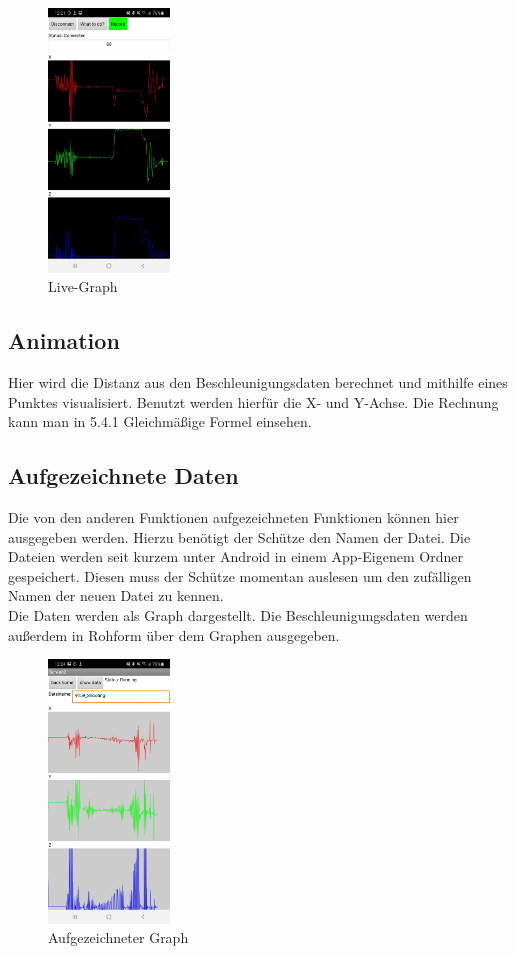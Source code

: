 \begin{figure} [h]
    \centering
    \includegraphics[height = 7cm]{Bilder/Graph}
    \caption{Live-Graph}
    \end{figure}

\subsection{Animation}
Hier wird die Distanz aus den Beschleunigungsdaten berechnet und mithilfe eines Punktes
visualisiert. Benutzt werden hierfür die X- und Y-Achse. Die Rechnung kann man in 
\refname { 5.4.1 Gleichmäßige Formel} einsehen.
\subsection{Aufgezeichnete Daten}
Die von den anderen Funktionen aufgezeichneten Funktionen können hier ausgegeben
werden. Hierzu benötigt der Schütze den Namen der Datei. Die Dateien werden
seit kurzem unter Android in einem App-Eigenem Ordner gespeichert. Diesen muss
der Schütze momentan auslesen um den zufälligen Namen der neuen Datei zu kennen.\\
Die Daten werden als Graph dargestellt. Die Beschleunigungsdaten werden außerdem
in Rohform über dem Graphen ausgegeben.\\

\begin{figure} [h]
    \centering
    \includegraphics[height = 7cm]{Bilder/GraphRec}
    \caption{Aufgezeichneter Graph}
    \end{figure}


